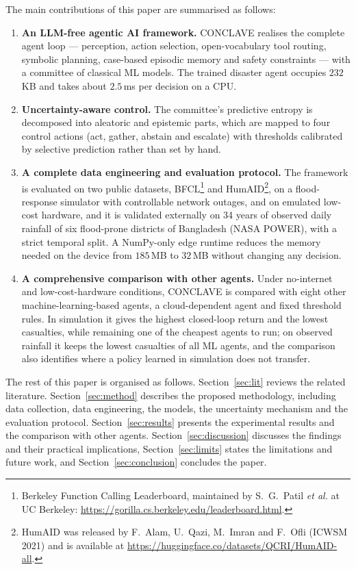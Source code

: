 \documentclass[journal]{IEEEtran}
\begin{document}
The main contributions of this paper are summarised as follows:
\begin{enumerate}
\item \textbf{An LLM-free agentic AI framework.} CONCLAVE realises the
      complete agent loop --- perception, action selection, open-vocabulary
      tool routing, symbolic planning, case-based episodic memory and safety
      constraints --- with a committee of classical ML models. The trained
      disaster agent occupies $232$\,KB and takes about $2.5$\,ms per decision
      on a CPU.
\item \textbf{Uncertainty-aware control.} The committee's predictive entropy
      is decomposed into aleatoric and epistemic parts, which are mapped to
      four control actions (act, gather, abstain and escalate) with thresholds
      calibrated by selective prediction rather than set by hand.
\item \textbf{A complete data engineering and evaluation protocol.} The
      framework is evaluated on two public datasets,
      BFCL\footnote{Berkeley Function Calling Leaderboard, maintained by
      S.~G.~Patil \emph{et al.} at UC Berkeley:
      \url{https://gorilla.cs.berkeley.edu/leaderboard.html}.} and
      HumAID\footnote{HumAID was released by F.~Alam, U.~Qazi, M.~Imran and
      F.~Ofli (ICWSM 2021) and is available at
      \url{https://huggingface.co/datasets/QCRI/HumAID-all}.}, on a
      flood-response simulator with controllable network outages, and on
      emulated low-cost hardware, and it is validated externally on 34 years of
      observed daily rainfall of six flood-prone districts of Bangladesh
      (NASA POWER), with a strict temporal split. A NumPy-only edge runtime reduces the memory
      needed on the device from $185$\,MB to $32$\,MB without changing any
      decision.
\item \textbf{A comprehensive comparison with other agents.} Under
      no-internet and low-cost-hardware conditions, CONCLAVE is compared with
      eight other machine-learning-based agents, a cloud-dependent agent and
      fixed threshold rules. In simulation it gives the highest closed-loop
      return and the lowest casualties, while remaining one of the cheapest
      agents to run; on observed rainfall it keeps the lowest casualties of
      all ML agents, and the comparison also identifies where a policy
      learned in simulation does not transfer.
\end{enumerate}

The rest of this paper is organised as follows. Section~\ref{sec:lit}
reviews the related literature. Section~\ref{sec:method} describes the
proposed methodology, including data collection, data engineering, the models,
the uncertainty mechanism and the evaluation protocol.
Section~\ref{sec:results} presents the experimental results and the
comparison with other agents. Section~\ref{sec:discussion} discusses the
findings and their practical implications, Section~\ref{sec:limits} states
the limitations and future work, and Section~\ref{sec:conclusion} concludes
the paper.
\end{document}
